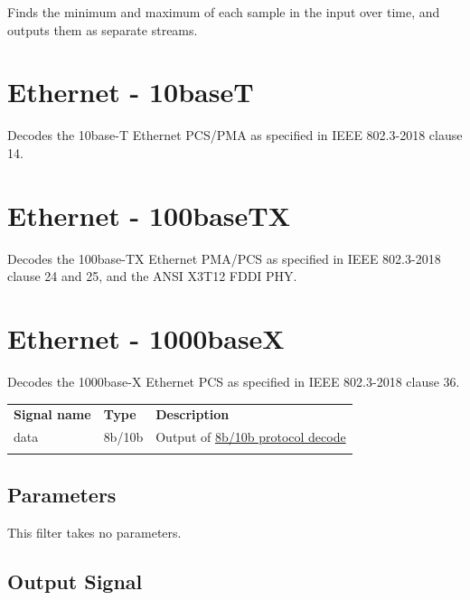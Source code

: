 Finds the minimum and maximum of each sample in the input over time, and outputs them as separate streams.

\pagebreak
\section{Ethernet - 10baseT}

Decodes the 10base-T Ethernet PCS/PMA as specified in IEEE 802.3-2018 clause 14.

\pagebreak
\section{Ethernet - 100baseTX}

Decodes the 100base-TX Ethernet PMA/PCS as specified in IEEE 802.3-2018 clause 24 and 25, and the ANSI X3T12 FDDI PHY.

\pagebreak
\section{Ethernet - 1000baseX}
\label{proto:1000basex}

Decodes the 1000base-X Ethernet PCS as specified in IEEE 802.3-2018 clause 36.

\begin{tabularx}{16cm}{llX}
\thickhline
\textbf{Signal name} & \textbf{Type} & \textbf{Description} \\
\thickhline
data & 8b/10b & Output of \hyperref[proto:8b10b]{8b/10b protocol decode}\\
\thickhline
\end{tabularx}

\subsection{Parameters}

This filter takes no parameters.

\subsection{Output Signal}

